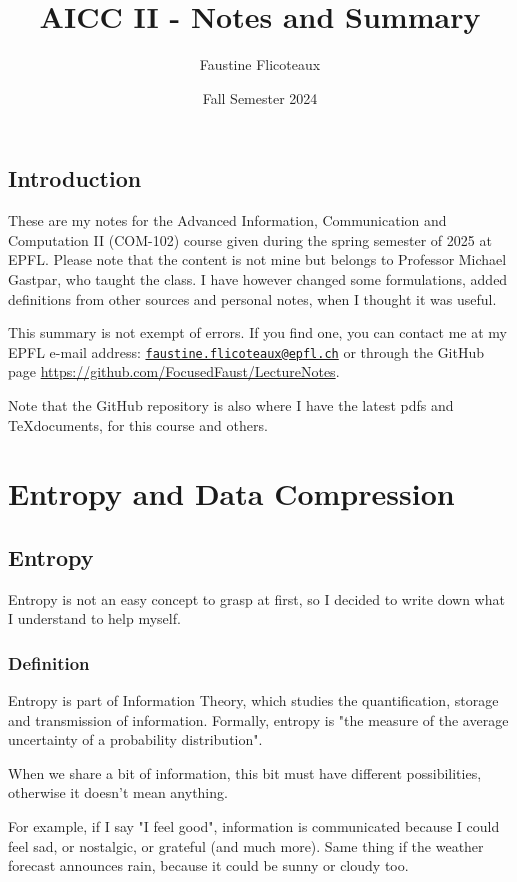 \documentclass[10pt,a4paper]{book}
\title{AICC II - Notes and Summary}
\author{Faustine Flicoteaux}
\date{Fall Semester 2024}
\begin{document}
\maketitle
\tableofcontents
\newpage


\section*{Introduction}
These are my notes for the Advanced Information, Communication and Computation II (COM-102) course given during the spring semester of 2025 at EPFL. Please note that the content is not mine but belongs to Professor Michael Gastpar, who taught the class. I have however changed some formulations, added definitions from other sources and personal notes, when I thought it was useful.\par
This summary is not exempt of errors. If you find one, you can contact me at my EPFL e-mail address: \texttt{\href{mailto:faustine.flicoteaux@epfl.ch}{faustine.flicoteaux@epfl.ch}} or through the GitHub page \url{https://github.com/FocusedFaust/LectureNotes}.\par 
Note that the GitHub repository is also where I have the latest pdfs and \TeX documents, for this course and others.

\chapter{Entropy and Data Compression}

\section{Entropy}
Entropy is not an easy concept to grasp at first, so I decided to write down what I understand to help myself.

\subsection{Definition}
Entropy is part of Information Theory, which studies the quantification, storage and transmission of information. Formally, entropy is "the measure of the average uncertainty of a probability distribution". \par 
When we share a bit of information, this bit must have different possibilities, otherwise it doesn't mean anything.\par 
For example, if I say "I feel good", information is communicated because I could feel sad, or nostalgic, or grateful (and much more). Same thing if the weather forecast announces rain, because it could be sunny or cloudy too.
\end{document}

